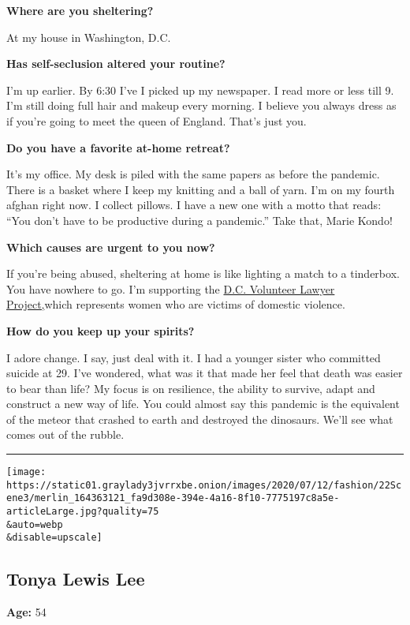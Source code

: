 \textbf{Where are you sheltering?}

At my house in Washington, D.C.

\textbf{Has self-seclusion altered your routine?}

I'm up earlier. By 6:30 I've I picked up my newspaper. I read more or
less till 9. I'm still doing full hair and makeup every morning. I
believe you always dress as if you're going to meet the queen of
England. That's just you.

\textbf{Do you have a favorite at-home retreat?}

It's my office. My desk is piled with the same papers as before the
pandemic. There is a basket where I keep my knitting and a ball of yarn.
I'm on my fourth afghan right now. I collect pillows. I have a new one
with a motto that reads: ``You don't have to be productive during a
pandemic.'' Take that, Marie Kondo!

\textbf{Which causes are urgent to you now?}

If you're being abused, sheltering at home is like lighting a match to a
tinderbox. You have nowhere to go. I'm supporting the
\href{https://www.dcvlp.org}{D.C. Volunteer Lawyer Project,}which
represents women who are victims of domestic violence.

\textbf{How do you keep up your spirits?}

I adore change. I say, just deal with it. I had a younger sister who
committed suicide at 29. I've wondered, what was it that made her feel
that death was easier to bear than life? My focus is on resilience, the
ability to survive, adapt and construct a new way of life. You could
almost say this pandemic is the equivalent of the meteor that crashed to
earth and destroyed the dinosaurs. We'll see what comes out of the
rubble.

\begin{center}\rule{0.5\linewidth}{\linethickness}\end{center}

\texttt{[image: https://static01.graylady3jvrrxbe.onion/images/2020/07/12/fashion/22Scene3/merlin\_164363121\_fa9d308e-394e-4a16-8f10-7775197c8a5e-articleLarge.jpg?quality=75\\\&auto=webp\\\&disable=upscale]}

\hypertarget{tonya-lewis-lee}{%
\subsection{Tonya Lewis Lee}\label{tonya-lewis-lee}}

\textbf{Age:} 54


